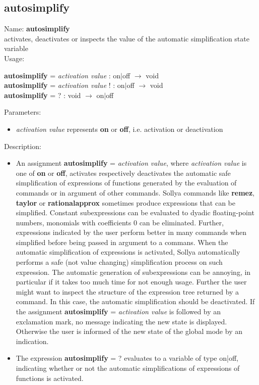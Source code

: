 \subsection{ autosimplify }
\noindent Name: \textbf{autosimplify}\\
activates, deactivates or inspects the value of the automatic simplification state variable\\

\noindent Usage: 
\begin{center}
\textbf{autosimplify} = \emph{activation value} : \textsf{on$|$off} $\rightarrow$ \textsf{void}\\
\textbf{autosimplify} = \emph{activation value} ! : \textsf{on$|$off} $\rightarrow$ \textsf{void}\\
\textbf{autosimplify} = ? : \textsf{void} $\rightarrow$ \textsf{on$|$off}\\
\end{center}
Parameters: 
\begin{itemize}
\item \emph{activation value} represents \textbf{on} or \textbf{off}, i.e. activation or deactivation
\end{itemize}
\noindent Description: \begin{itemize}

\item An assignment \textbf{autosimplify} = \emph{activation value}, where \emph{activation value}
   is one of \textbf{on} or \textbf{off}, activates respectively deactivates the
   automatic safe simplification of expressions of functions generated by
   the evaluation of commands or in argument of other commands.
   Sollya commands like \textbf{remez}, \textbf{taylor} or \textbf{rationalapprox} sometimes
   produce expressions that can be simplified. Constant subexpressions
   can be evaluated to dyadic floating-point numbers, monomials with
   coefficients $0$ can be eliminated. Further, expressions
   indicated by the user perform better in many commands when simplified
   before being passed in argument to a commans. When the automatic
   simplification of expressions is activated, Sollya automatically
   performs a safe (not value changing) simplification process on such
   expression.
   The automatic generation of subexpressions can be annoying, in
   particular if it takes too much time for not enough usage. Further the
   user might want to inspect the structure of the expression tree
   returned by a command. In this case, the automatic simplification
   should be deactivated.
   If the assignment \textbf{autosimplify} = \emph{activation value} is followed by an
   exclamation mark, no message indicating the new state is
   displayed. Otherwise the user is informed of the new state of the
   global mode by an indication.

\item The expression \textbf{autosimplify} = ? evaluates to a variable of type
   \textsf{on|off}, indicating whether or not the automatic simplifications
   of expressions of functions is activated.
\end{itemize}
